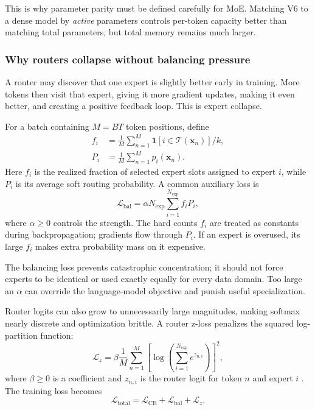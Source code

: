 \documentclass[11pt,a4paper]{article}
\theoremstyle{definition}
\theoremstyle{plain}
\newcommand{\vx}{\bm{x}}
\newcommand{\loss}{\mathcal{L}}
\newcommand{\ind}{\mathbf{1}}
\begin{document}
This is why parameter parity must be defined carefully for MoE. Matching V6 to a dense model by \emph{active} parameters controls per-token capacity better than matching total parameters, but total memory remains much larger.

\subsubsection{Why routers collapse without balancing pressure}

A router may discover that one expert is slightly better early in training. More tokens then visit that expert, giving it more gradient updates, making it even better, and creating a positive feedback loop. This is expert collapse.

For a batch containing $M=BT$ token positions, define
\begin{align}
    f_i&=\frac{1}{M}\sum_{n=1}^{M}
         \ind[i\in\mathcal{T}(\vx_n)]/k,\\
    P_i&=\frac{1}{M}\sum_{n=1}^{M}p_i(\vx_n).
\end{align}
Here $f_i$ is the realized fraction of selected expert slots assigned to expert $i$, while $P_i$ is its average soft routing probability. A common auxiliary loss is
\begin{equation}\label{eq:moe-balance}
    \loss_{\mathrm{bal}}
    =\alpha N_{\mathrm{exp}}
      \sum_{i=1}^{N_{\mathrm{exp}}}f_iP_i,
\end{equation}
where $\alpha\geq0$ controls the strength. The hard counts $f_i$ are treated as constants during backpropagation; gradients flow through $P_i$. If an expert is overused, its large $f_i$ makes extra probability mass on it expensive.

\begin{warningbox}
The balancing loss prevents catastrophic concentration; it should not force experts to be identical or used exactly equally for every data domain. Too large an $\alpha$ can override the language-model objective and punish useful specialization.
\end{warningbox}

Router logits can also grow to unnecessarily large magnitudes, making softmax nearly discrete and optimization brittle. A router z-loss penalizes the squared log-partition function:
\begin{equation}\label{eq:moe-zloss}
    \loss_z
    =\beta\frac{1}{M}
      \sum_{n=1}^{M}
      \left[\log\left(\sum_{i=1}^{N_{\mathrm{exp}}}e^{z_{n,i}}\right)\right]^2,
\end{equation}
where $\beta\geq0$ is a coefficient and $z_{n,i}$ is the router logit for token $n$ and expert $i$ \cite{zoph2022stmoe}. The training loss becomes
\begin{equation}
    \loss_{\mathrm{total}}
    =\loss_{\mathrm{CE}}+\loss_{\mathrm{bal}}+\loss_z.
\end{equation}
\end{document}
